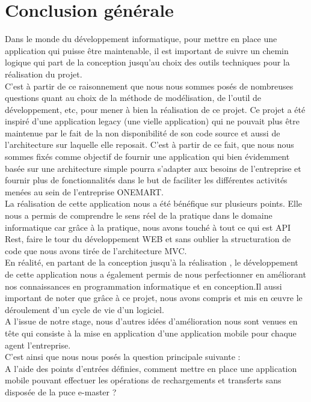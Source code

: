 \chapter*{Conclusion générale}

	Dans le monde du développement informatique, pour mettre en place une application qui puisse être maintenable, il est important de suivre un chemin logique qui part de la conception jusqu'au choix des outils techniques pour la réalisation du projet.\\	C'est à partir de ce raisonnement que nous nous sommes posés de nombreuses questions quant au choix de la méthode de modélisation, de l'outil de développement, etc, pour mener à bien la réalisation de ce projet.
	Ce projet a été inspiré d'une application legacy (une vielle application) qui ne pouvait plus être maintenue par le fait de la non disponibilité de son code source et aussi de l'architecture sur laquelle elle reposait. C'est à partir de ce fait, que nous nous sommes fixés comme objectif de fournir une application qui bien évidemment basée sur une architecture simple pourra s'adapter aux besoins de l'entreprise et fournir plus de fonctionnalités dans le but de faciliter les différentes activités menées au sein de l'entreprise ONEMART.\\
	
	La réalisation de cette application nous a été bénéfique sur plusieurs points. Elle nous a permis de comprendre le sens réel de la pratique dans le domaine informatique car grâce à la pratique, nous avons touché à tout ce qui est API Rest, faire le tour du développement WEB et sans oublier la structuration de code que nous avons tirée de l'architecture MVC.\\
	
	En réalité, en partant de la conception jusqu'à la réalisation , le développement de cette application nous a également permis de nous perfectionner en améliorant nos connaissances en programmation informatique et en conception.Il aussi important de noter que grâce à ce projet, nous avons compris et mis en œuvre le déroulement d'un cycle de vie d'un logiciel.\\
	
	A l'issue de notre stage, nous d'autres idées d'amélioration nous sont venues en tête qui consiste à la mise en application d'une application mobile pour chaque agent l'entreprise.\\
	C'est ainsi que nous nous posés la question principale suivante :\\
	
	A l'aide des points d'entrées définies, comment mettre en place une application mobile pouvant effectuer les opérations de rechargements et transferts sans disposée de la puce e-master ?
	